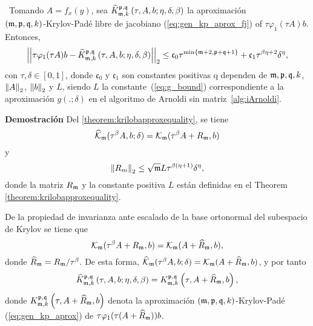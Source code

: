 \begin{theorem}\label{theorem:Krylov-fj-bound}
\cite{naranjo2021locally}~Tomando $A=f_x(y)$, sea $\widehat{K}_{\mathfrak{m},k}^{\mathfrak{p},\mathfrak{q}}\left(\tau, A , b ; \eta, \delta, \beta \right)$ la aproximación \\
	$(\mathfrak{m} , \mathfrak{p} ,\mathfrak{q} , k)$-Krylov-Padé libre de jacobiano (\ref{eq:gen_kp_aprox_fj}) of $\tau \varphi_1(\tau A)b$. Entonces,
	\begin{equation}
		\left\lvert\left\lvert  \tau \varphi_1(\tau A)b -
		\widehat{K}_{\mf,k}^{\pf,\qf}\left( \tau, A , b ; \eta, \delta, \beta \right)\right\rvert\right\rvert_2%
		\leq \mathfrak{c}_0 \tau^{\min\{\mf+2,\pf+\qf+1\}} + \mathfrak{c}_1 \tau^{\beta\eta+2}\delta^{\eta},
	\end{equation}
	con $\tau,\delta \in [0,1]$, donde $\mathfrak{c}_0$ y $\mathfrak{c}_1$ son constantes positivas q dependen de $\mathfrak{m},\mathfrak{p},\mathfrak{q},k$, $\left\lVert A \right\rVert_2$, $\left\lVert b \right\rVert_2$ y $L$, siendo $L$ la constante~(\ref{eq:g_bound}) correspondiente a la aproximación $g(.;\delta)$ en el algoritmo de Arnoldi sin matriz~\ref{alg:iArnoldi}.
\end{theorem}
\textbf{Demostración} Del \ref{theorem:krilobapproxequality}, se tiene
\[ \widehat{\mathcal{K}}_{\mathfrak{m}}(\tau^\beta A,b;\delta)=\mathcal{K}_{\mathfrak{m}}(\tau^\beta A+R_{\mathfrak{m}},b) \]
y
\begin{equation}
	\left\lVert R_m \right\rVert_2\leq \sqrt{\mathfrak{m}} L \tau^{\beta(\eta+1)}\delta^{\eta},  \label{eq:fjbound3}
\end{equation}
donde la matriz $R_{\mathfrak{m}}$ y la constante positiva $L$ están definidas en el Theorem \ref{theorem:krilobapproxequality}. 

De la propiedad de invarianza ante escalado de la base ortonormal del subespacio de Krylov se tiene que
\[ \mathcal{K}_{\mathfrak{m}}(\tau^\beta A+R_{\mathfrak{m}},b) = \mathcal{K}_{\mathfrak{m}}(A+\widehat{R}_{\mathfrak{m}},b), \]
donde $\widehat{R}_{\mathfrak{m}} = R_{\mathfrak{m}}/\tau^\beta$. De esta forma, $\widehat{\mathcal{K}}_{\mathfrak{m}}(\tau^\beta A,b;\delta)=\mathcal{K}_{\mathfrak{m}}(A+\widehat{R}_{\mathfrak{m}},b)$, y por tanto
\begin{equation}
	\widehat{K}_{\mathfrak{m},k}^{\mathfrak{p},\mathfrak{q}}\left( \tau, A , b; \eta, \delta, \beta \right) = K_{\mathfrak{m},k}^{\mathfrak{p},\mathfrak{q}}\left( \tau, A+\widehat{R}_{\mathfrak{m}} , b \right), \label{identidad}
\end{equation}
donde $K_{\mathfrak{m},k}^{\mathfrak{p},\mathfrak{q}}\left( \tau, A+\widehat{R}_{\mathfrak{m}} , b \right)$ denota la aproximación $(\mathfrak{m} , \mathfrak{p} ,\mathfrak{q} , k)$-Krylov-Padé (\ref{eq:gen_kp_aprox}) de $\tau \varphi_1(\tau (A+\widehat{R}_{\mathfrak{m}}))b$. 

